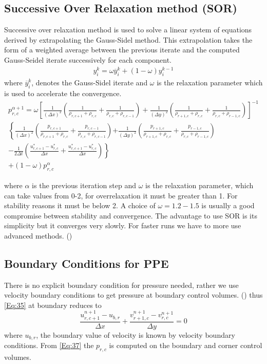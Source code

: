 \subsection{Successive Over Relaxation method (SOR)}
Successive over relaxation method is used to solve a linear system of equations derived by extrapolating the Gauss-Sidel method. This extrapolation 
takes the form of a weighted average between the previous iterate and the computed Gauss-Seidel iterate successively for each component.
\begin{eqnarray*}
 y_i^k = \omega \overline{y}_i^k + (1-\omega)y_i^{k-1} 
\end{eqnarray*}
where $\overline{y}_i^k$, denotes the Gauss-Sidel iterate and $\omega$ is the relaxation parameter which is used to accelerate the convergence.
\begin{eqnarray*}
 p_{r,c}^{\alpha+1} = \omega \left[\frac{1}{(\Delta x)^2}\left(\frac{1}{\rho_{r,c+1}+\rho_{r,c}}+\frac{1}{\rho_{r,c}+\rho_{r,c-1}}\right)
+\frac{1}{(\Delta y)^2}\left(\frac{1}{\rho_{r+1,c}+\rho_{r,c}}+\frac{1}{\rho_{r,c}+\rho_{r-1,c}}\right)\right]^{-1} \\
\left\{\frac{1}{(\Delta x)^2}\left(\frac{p_{r,c+1}}{\rho_{r,c+1}+\rho_{r,c}}+\frac{p_{r,c-1}}{\rho_{r,c}+\rho_{r,c-1}}\right)\right.
\left.+\frac{1}{(\Delta y)^2}\left(\frac{p_{r+1,c}}{\rho_{r+1,c}+\rho_{r,c}}+\frac{p_{r-1,c}}{\rho_{r,c}+\rho_{r-1,c}}\right)\right. \\
-\frac{1}{2\Delta t}\left. \left(\frac{u_{r,c+1}^*-u_{r,c}^*}{\Delta x} +\frac{u_{r,c+1}^*-u_{r,c}^*}{\Delta x}\right)\right\}\\
+(1-\omega)p_{r,c}^{\alpha}
\end{eqnarray*}

where $\alpha$ is the previous iteration step and $\omega$ is the relaxation parameter, which can take values from 0-2, for overrelaxation it must be greater than 1.
For stability reasons it must be below 2. A choice of $\omega= 1.2 -1.5$ is usually a good compromise between stability and convergence. The advantage to use SOR is its simplicity 
but it converges very slowly. For faster runs we have to more use advanced methods. (\cite{Tryggvason2011})

\subsection{Boundary Conditions for PPE}
There is no explicit boundary condition for pressure needed, rather we use velocity boundary conditions to get pressure at boundary control volumes. (\cite{Tryggvason2011})
thus \ref{Eq:35} at boundary reduces to 
  \begin{equation}
 \frac{u_{r,c+1}^{n+1}-u_{b,r}}{\Delta x} + \frac{v_{r+1,c}^{n+1}-v_{r,c}^{n+1}}{\Delta y} = 0
 \label{Eq:37}
\end{equation}
where $u_{b,r}$, the boundary value of velocity is known by velocity boundary conditions. From \ref{Eq:37}  the $p_{r,c}$ is computed on the boundary and corner control volumes.
   
